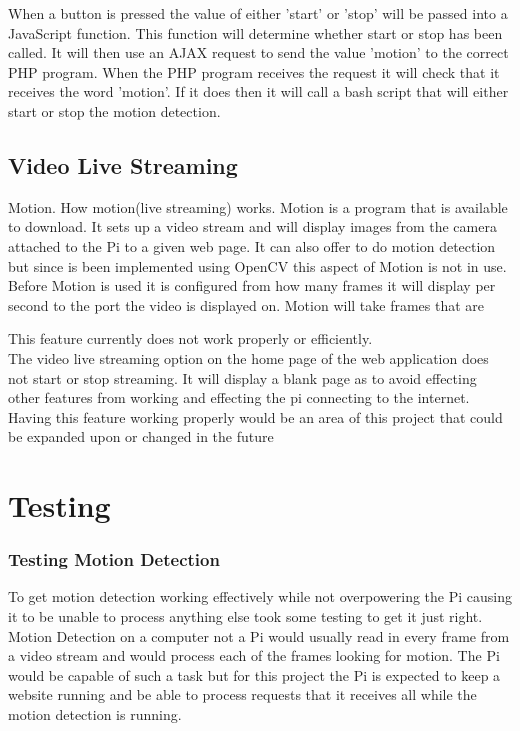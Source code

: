 \documentclass[]{report}
\begin{document}
When a button is pressed the value of either 'start' or 'stop' will be passed into a JavaScript function. This function will determine whether start or stop has been called. It will then use an AJAX request to send the value 'motion' to the correct PHP program. When the PHP program receives the request it will check that it receives the word 'motion'. If it does then it will call a bash script that will either start or stop the motion detection. \\


\section{Video Live Streaming}
\label{sec:video}
Motion. How motion(live streaming) works.
Motion is a program that is available to download. It sets up a video stream and will display images from the camera attached to the Pi to a given web page. It can also offer to do motion detection but since is been implemented using OpenCV this aspect of Motion is not in use.\\

Before Motion is used it is configured from how many frames it will display per second to the port the video is displayed on. Motion will take frames that are

This feature currently does not work properly or efficiently.\\

The video live streaming option on the home page of the web application does not start or stop streaming. It will display a blank page as to avoid effecting other features from working and effecting the pi connecting to the internet. Having this feature working properly would be an area of this project that could be expanded upon or changed in the future\\


\chapter{Testing}
\label{ch:test}
%
%
\subsection{Testing Motion Detection}
\label{subsec:motionTest}
%
To get motion detection working effectively while not overpowering the Pi causing it to be unable to process anything else took some testing to get it just right. Motion Detection on a computer not a Pi would usually read in every frame from a video stream and would process each of the frames looking for motion. The Pi would be capable of such a task but for this project the Pi is expected to keep a website running and be able to process requests that it receives all while the motion detection is running.\\
\end{document}
